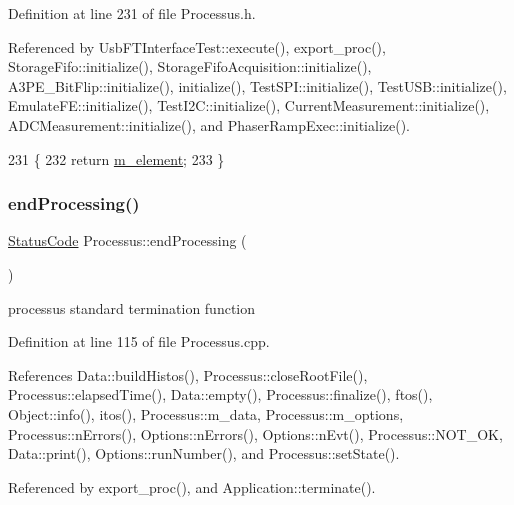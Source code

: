 Definition at line 231 of file Processus.\+h.



Referenced by Usb\+F\+T\+Interface\+Test\+::execute(), export\+\_\+proc(), Storage\+Fifo\+::initialize(), Storage\+Fifo\+Acquisition\+::initialize(), A3\+P\+E\+\_\+\+Bit\+Flip\+::initialize(), initialize(), Test\+S\+P\+I\+::initialize(), Test\+U\+S\+B\+::initialize(), Emulate\+F\+E\+::initialize(), Test\+I2\+C\+::initialize(), Current\+Measurement\+::initialize(), A\+D\+C\+Measurement\+::initialize(), and Phaser\+Ramp\+Exec\+::initialize().


\begin{DoxyCode}
231                       \{
232     \textcolor{keywordflow}{return} \hyperlink{classProcessus_aa9d24d53c3e52f36786cabb5d8e296e7}{m\_element};
233   \}
\end{DoxyCode}
\mbox{\label{classProcessus_a5e4da662989d356b89d490b89c7afbfd}} 
\subsubsection{\texorpdfstring{end\+Processing()}{endProcessing()}}
{\footnotesize\ttfamily \hyperlink{classStatusCode}{Status\+Code} Processus\+::end\+Processing (\begin{DoxyParamCaption}{ }\end{DoxyParamCaption})\hspace{0.3cm}{\ttfamily [inherited]}}

processus standard termination function 

Definition at line 115 of file Processus.\+cpp.



References Data\+::build\+Histos(), Processus\+::close\+Root\+File(), Processus\+::elapsed\+Time(), Data\+::empty(), Processus\+::finalize(), ftos(), Object\+::info(), itos(), Processus\+::m\+\_\+data, Processus\+::m\+\_\+options, Processus\+::n\+Errors(), Options\+::n\+Errors(), Options\+::n\+Evt(), Processus\+::\+N\+O\+T\+\_\+\+OK, Data\+::print(), Options\+::run\+Number(), and Processus\+::set\+State().



Referenced by export\+\_\+proc(), and Application\+::terminate().


